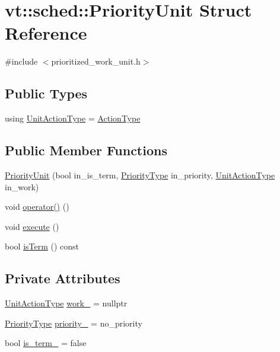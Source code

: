 \hypertarget{structvt_1_1sched_1_1_priority_unit}{}\section{vt\+:\+:sched\+:\+:Priority\+Unit Struct Reference}
\label{structvt_1_1sched_1_1_priority_unit}


{\ttfamily \#include $<$prioritized\+\_\+work\+\_\+unit.\+h$>$}

\subsection*{Public Types}
\begin{DoxyCompactItemize}
\item 
using \hyperlink{structvt_1_1sched_1_1_priority_unit_aadc2c7160cb86f45260dbdd2d39b1b68}{Unit\+Action\+Type} = \hyperlink{namespacevt_ae0a5a7b18cc99d7b732cb4d44f46b0f3}{Action\+Type}
\end{DoxyCompactItemize}
\subsection*{Public Member Functions}
\begin{DoxyCompactItemize}
\item 
\hyperlink{structvt_1_1sched_1_1_priority_unit_ae0f822497e235515829b196c0a78d07f}{Priority\+Unit} (bool in\+\_\+is\+\_\+term, \hyperlink{namespacevt_a86bff9f556eb761b27fc8600d006ac04}{Priority\+Type} in\+\_\+priority, \hyperlink{structvt_1_1sched_1_1_priority_unit_aadc2c7160cb86f45260dbdd2d39b1b68}{Unit\+Action\+Type} in\+\_\+work)
\item 
void \hyperlink{structvt_1_1sched_1_1_priority_unit_a40a55799751087271c193a493ac57e6c}{operator()} ()
\item 
void \hyperlink{structvt_1_1sched_1_1_priority_unit_a0304a73083bac18a1a4fed9aa29a9efa}{execute} ()
\item 
bool \hyperlink{structvt_1_1sched_1_1_priority_unit_aa09abddcc94303d6d8e7efae5fb76173}{is\+Term} () const
\end{DoxyCompactItemize}
\subsection*{Private Attributes}
\begin{DoxyCompactItemize}
\item 
\hyperlink{structvt_1_1sched_1_1_priority_unit_aadc2c7160cb86f45260dbdd2d39b1b68}{Unit\+Action\+Type} \hyperlink{structvt_1_1sched_1_1_priority_unit_ab8b3a78c58c74378e0d03de0e10af30d}{work\+\_\+} = nullptr
\item 
\hyperlink{namespacevt_a86bff9f556eb761b27fc8600d006ac04}{Priority\+Type} \hyperlink{structvt_1_1sched_1_1_priority_unit_ad8f7fe9067612b7902a6258f3260cfac}{priority\+\_\+} = no\+\_\+priority
\item 
bool \hyperlink{structvt_1_1sched_1_1_priority_unit_ac438faaa08acbc4066055a7494d3feba}{is\+\_\+term\+\_\+} = false
\end{DoxyCompactItemize}
